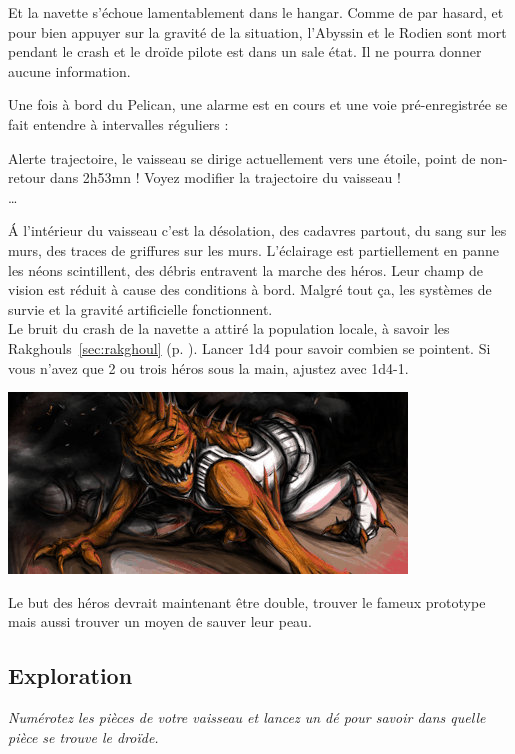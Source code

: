 Et la navette s’échoue lamentablement dans le hangar. Comme de par hasard, et pour bien appuyer sur la gravité de la situation, l’Abyssin et le Rodien sont mort pendant le crash et le droïde pilote est dans un sale état. Il ne pourra donner aucune information.

Une fois à bord du Pelican, une alarme est en cours et une voie pré-enregistrée se fait entendre à intervalles réguliers :

\begin{quotebox}
	Alerte trajectoire, le vaisseau se dirige actuellement vers une étoile, point de non-retour dans 2h53mn ! 
	Voyez modifier la trajectoire du vaisseau !\\ 
	\ldots
\end{quotebox}

\'A l’intérieur du vaisseau c’est la désolation, des cadavres partout, du sang sur les murs, des traces de griffures sur les murs. L’éclairage est partiellement en panne les néons scintillent, des débris entravent la marche des héros. Leur champ de vision est réduit à cause des conditions à bord. Malgré tout ça, les systèmes de survie et la gravité artificielle fonctionnent.\\

Le bruit du crash de la navette a attiré la population locale, à savoir les Rakghouls~\ref{sec:rakghoul} (p. \pageref{sec:rakghoul}). Lancer 1d4 pour savoir combien se pointent. Si vous n’avez que 2 ou trois héros sous la main, ajustez avec 1d4-1.

\noindent\includegraphics[width=\linewidth]{_img/bestiary/rakghoul.jpg}

Le but des héros devrait maintenant être double, trouver le fameux prototype mais aussi trouver un moyen de sauver leur peau. 

\subsection{Exploration}
\emph{Numérotez les pièces de votre vaisseau et lancez un dé pour savoir dans quelle pièce se trouve le droïde.}\\

